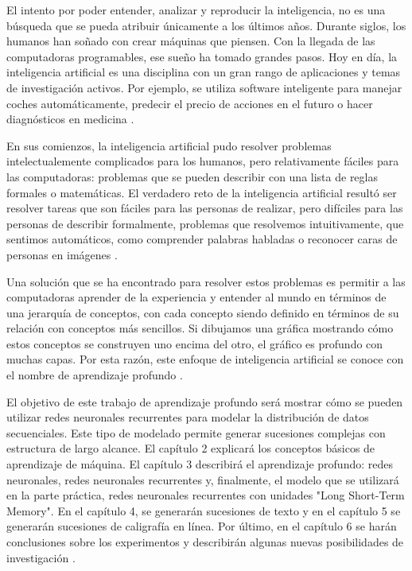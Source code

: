 \noindent
El intento por poder entender, analizar y reproducir la inteligencia, no es una búsqueda que se pueda atribuir únicamente a los últimos años. Durante siglos, los humanos han soñado con crear máquinas que piensen. Con la llegada de las computadoras programables, ese sueño ha tomado grandes pasos. Hoy en día, la inteligencia artificial es una disciplina con un gran rango de aplicaciones y temas de investigación activos. Por ejemplo, se utiliza software inteligente para manejar coches automáticamente, predecir el precio de acciones en el futuro o hacer diagnósticos en medicina \cite{goodfellow-et-al-2016}  \cite{hastie01statisticallearning} \cite{Haugeland:1985:AIV:4694}.

\vspace{1em}

En sus comienzos, la inteligencia artificial pudo resolver problemas intelectualemente complicados para los humanos, pero relativamente fáciles para las computadoras: problemas que se pueden describir con una lista de reglas formales o matemáticas. El verdadero reto de la inteligencia artificial resultó ser resolver tareas que son fáciles para las personas de realizar, pero difíciles para las personas de describir formalmente, problemas que resolvemos intuitivamente, que sentimos automáticos, como comprender palabras habladas o reconocer caras de personas en imágenes \cite{goodfellow-et-al-2016}.

\vspace{1em}

Una solución que se ha encontrado para resolver estos problemas es permitir a las computadoras aprender de la experiencia y entender al mundo en términos de una jerarquía de conceptos, con cada concepto siendo definido en términos de su relación con conceptos más sencillos. Si dibujamos una gráfica mostrando cómo estos conceptos se construyen uno encima del otro, el gráfico es profundo con muchas capas. Por esta razón, este enfoque de inteligencia artificial se conoce con el nombre de aprendizaje profundo \cite{deep-learning-methods-and-applications} \cite{goodfellow-et-al-2016}.

\vspace{1em}

 El objetivo de este trabajo de aprendizaje profundo será mostrar cómo se pueden utilizar redes neuronales recurrentes para modelar la distribución de datos secuenciales. Este tipo de modelado permite generar sucesiones complejas con estructura de largo alcance. El capítulo 2 explicará los conceptos básicos de aprendizaje de máquina. El capítulo 3 describirá el aprendizaje profundo: redes neuronales, redes neuronales recurrentes y, finalmente, el modelo que se utilizará en la parte práctica, redes neuronales recurrentes con unidades "Long Short-Term Memory". En el capítulo 4, se generarán sucesiones de texto y en el capítulo 5 se generarán sucesiones de caligrafía en línea. Por último, en el capítulo 6 se harán conclusiones sobre los experimentos y describirán algunas nuevas posibilidades de investigación \cite{DBLP:journals/corr/Graves13}.

